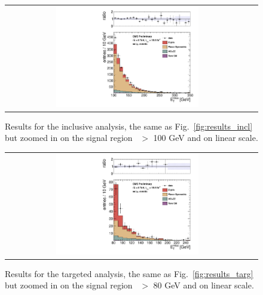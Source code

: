 \begin{table}[htb]
\begin{center}
\begin{tabular}{l|c|c|c|c}
\hline
\hline

\end{tabular}
\end{center}
\end{table}

\clearpage

\begin{figure}[!h]
\begin{center}
\begin{tabular}{cc}
\includegraphics[width=0.6\textwidth]{plots/pfmet_all_19p5fb_zoom100.pdf}
\end{tabular}
\caption{ Results for the inclusive analysis, the same as Fig.~\ref{fig:results_incl} but zoomed in on the signal region \MET\ $>$ 100 GeV and on linear scale.
\label{fig:results_incl_zoom}
}
\end{center}
\end{figure}

\begin{figure}[!h]
\begin{center}
\begin{tabular}{cc}
\includegraphics[width=0.6\textwidth]{plots/pfmet_bveto_all_19p5fb_zoom80.pdf}
\end{tabular}
\caption{ Results for the targeted analysis, the same as Fig.~\ref{fig:results_targ} but zoomed in on the signal region \MET\ $>$ 80 GeV and on linear scale.
\label{fig:results_targ_zoom}
}
\end{center}
\end{figure}

\clearpage

